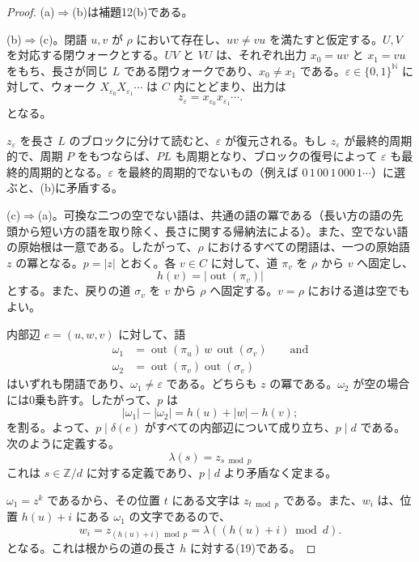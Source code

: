 \documentclass[11pt,reqno]{amsart}
\theoremstyle{definition}
\theoremstyle{definition}
\theoremstyle{remark}
\begin{document}
\begin{proof}\leavevmode\label{proof:21}
(a)\(\Rightarrow\)(b)は補題12(b)である。

(b)\(\Rightarrow\)(c)。閉語 \(u,v\) が \(\rho\) において存在し、\(uv\ne vu\) を満たすと仮定する。\(U,V\) を対応する閉ウォークとする。\(UV\) と \(VU\) は、それぞれ出力 \(x_0=uv\) と \(x_1=vu\) をもち、長さが同じ \(L\) である閉ウォークであり、\(x_0\ne x_1\) である。\(\varepsilon\in\{0,1\}^{\mathbb N}\) に対して、ウォーク \(X_{\varepsilon_0}X_{\varepsilon_1}\cdots\) は \(C\) 内にとどまり、出力は
\[
z_\varepsilon=x_{\varepsilon_0}x_{\varepsilon_1}\cdots.
\]
となる。

\(z_\varepsilon\) を長さ \(L\) のブロックに分けて読むと、\(\varepsilon\) が復元される。もし \(z_\varepsilon\) が最終的周期的で、周期 \(P\) をもつならば、\(PL\) も周期となり、ブロックの復号によって \(\varepsilon\) も最終的周期的となる。\(\varepsilon\) を最終的周期的でないもの（例えば \(0\,1\,00\,1\,000\,1\cdots\)）に選ぶと、(b)に矛盾する。

(c)\(\Rightarrow\)(a)。可換な二つの空でない語は、共通の語の冪である（長い方の語の先頭から短い方の語を取り除く、長さに関する帰納法による）。また、空でない語の原始根は一意である。したがって、\(\rho\) におけるすべての閉語は、一つの原始語 \(z\) の冪となる。\(p=|z|\) とおく。各 \(v\in C\) に対して、道 \(\pi_v\) を \(\rho\) から \(v\) へ固定し、
\[
h(v)=|\operatorname{out}(\pi_v)|
\]
とする。また、戻りの道 \(\sigma_v\) を \(v\) から \(\rho\) へ固定する。\(v=\rho\) における道は空でもよい。

内部辺 \(e=(u,w,v)\) に対して、語
\[
\begin{aligned}
\omega_1&=\operatorname{out}(\pi_u)\,w\,\operatorname{out}(\sigma_v)\qquad \text{and}\\
\omega_2&=\operatorname{out}(\pi_v)\operatorname{out}(\sigma_v)
\end{aligned}
\]
はいずれも閉語であり、\(\omega_1\ne\varepsilon\) である。どちらも \(z\) の冪である。\(\omega_2\) が空の場合には0乗も許す。したがって、\(p\) は
\[
|\omega_1|-|\omega_2|=h(u)+|w|-h(v);
\]
を割る。よって、\(p\mid\delta(e)\) がすべての内部辺について成り立ち、\(p\mid d\) である。次のように定義する。
\[
\lambda(s)=z_{s\bmod p}
\]
これは \(s\in\mathbb Z/d\) に対する定義であり、\(p\mid d\) より矛盾なく定まる。

\(\omega_1=z^k\) であるから、その位置 \(t\) にある文字は \(z_{t\bmod p}\) である。また、\(w_i\) は、位置 \(h(u)+i\) にある \(\omega_1\) の文字であるので、
\[
w_i=z_{(h(u)+i)\bmod p}=\lambda((h(u)+i)\bmod d).
\]
となる。これは根からの道の長さ \(h\) に対する(19)である。\qedhere
\end{proof}
\end{document}
